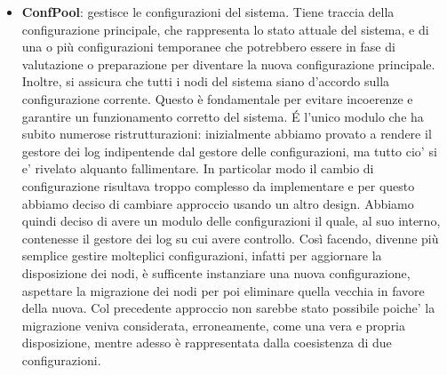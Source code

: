 \begin{itemize}
    \item \textbf{ConfPool}: 
        gestisce le configurazioni del sistema. Tiene traccia della configurazione principale, 
        che rappresenta lo stato attuale del sistema, e di una o più configurazioni temporanee 
        che potrebbero essere in fase di valutazione o preparazione per diventare la nuova 
        configurazione principale. Inoltre, si assicura che tutti i nodi del sistema siano d'accordo 
        sulla configurazione corrente. Questo è fondamentale per evitare incoerenze e garantire un 
        funzionamento corretto del sistema. \'E l'unico modulo che ha subito numerose ristrutturazioni:
        inizialmente abbiamo provato a rendere il gestore dei log indipentende dal gestore delle 
        configurazioni, ma tutto cio' si e' rivelato alquanto fallimentare. 
        In particolar modo il cambio di configurazione risultava troppo complesso da implementare e 
        per questo abbiamo deciso di cambiare approccio usando un altro design. Abbiamo 
        quindi deciso di avere un modulo delle configurazioni il quale, al suo interno, 
        contenesse il gestore dei log su cui avere controllo. Così facendo, divenne più semplice 
        gestire molteplici configurazioni, infatti per aggiornare
        la disposizione dei nodi, è sufficente instanziare una nuova configurazione, aspettare 
        la migrazione dei nodi per poi eliminare quella vecchia in favore della nuova. 
        Col precedente approccio non sarebbe stato possibile poiche' la migrazione veniva 
        considerata, erroneamente, come una vera e propria disposizione, mentre adesso è 
        rappresentata dalla coesistenza di due configurazioni. 


\end{itemize}
